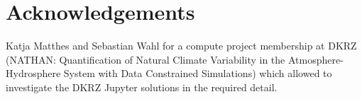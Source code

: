 \documentclass[11pt,a4paper]{article}
\begin{document}




\section{Acknowledgements}

Katja Matthes and Sebastian Wahl for a compute project membership at DKRZ (NATHAN: Quantification of Natural Climate Variability in the Atmosphere-Hydrosphere System with Data Constrained Simulations) which allowed to investigate the DKRZ Jupyter solutions in the required detail.


\appendix





\end{document}
